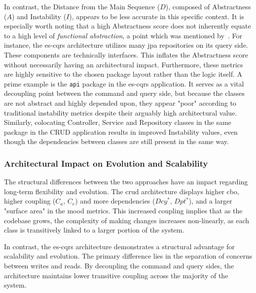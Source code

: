 In contrast, the Distance from the Main Sequence ($D$), composed of Abstractness ($A$) and Instability ($I$), appears to be less accurate in this specific context. It is especially worth noting that a high Abstractness score does not inherently equate to a high level of \emph{functional abstraction}, a point which was mentioned by~\cite{drotbohm_instability-abstractness-relationship_2024}. For instance, the \gls{es}-\gls{cqrs} architecture utilizes many \gls{jpa} repositories on its query side. These components are technically interfaces. This inflates the Abstractness score without necessarily having an architectural impact. Furthermore, these metrics are highly sensitive to the chosen package layout rather than the logic itself. A prime example is the \texttt{api} package in the \gls{es}-\gls{cqrs} application. It serves as a vital decoupling point between the command and query side, but because the classes are not abstract and highly depended upon, they appear "poor" according to traditional instability metrics despite their arguably high architectural value. Similarly, colocating Controller, Service and Repository classes in the same package in the CRUD application results in improved Instability values, even though the dependencies between classes are still present in the same way.

\subsubsection{Architectural Impact on Evolution and Scalability}

The structural differences between the two approaches have an impact regarding long-term flexibility and evolution. The \gls{crud} architecture displays higher \gls{cbo}, higher coupling ($C_a$, $C_e$) and more dependencies ($Dcy^*$, $Dpt^*$), and a larger "surface area" in the \gls{mood} metrics. This increased coupling implies that as the codebase grows, the complexity of making changes increases non-linearly, as each class is transitively linked to a larger portion of the system.

In contrast, the \gls{es}-\gls{cqrs} architecture demonstrates a structural advantage for scalability and evolution. The primary difference lies in the separation of concerns between writes and reads. By decoupling the command and query sides, the architecture maintains lower transitive coupling across the majority of the system.

